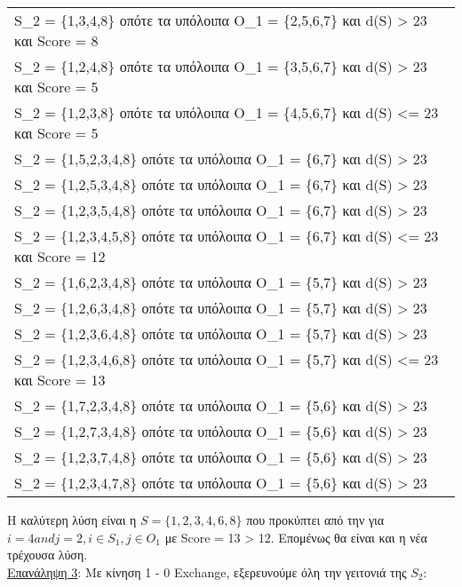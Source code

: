 \documentclass[12pt, a4paper]{article}
\begin{document}
\begin{table}[H]
\centering
\label{my-label}
\begin{tabular}{l}
S\_2 = \{1,3,4,8\} οπότε τα υπόλοιπα Ο\_1 = \{2,5,6,7\} και d(S) > 23 και Score =  8\\
S\_2 = \{1,2,4,8\} οπότε τα υπόλοιπα Ο\_1 = \{3,5,6,7\} και d(S) > 23 και Score =  5\\
S\_2 = \{1,2,3,8\} οπότε τα υπόλοιπα Ο\_1 = \{4,5,6,7\} και d(S) <= 23 και Score =  5\\
S\_2 = \{1,5,2,3,4,8\} οπότε τα υπόλοιπα Ο\_1 = \{6,7\} και d(S) > 23  \\
S\_2 = \{1,2,5,3,4,8\} οπότε τα υπόλοιπα Ο\_1 = \{6,7\} και d(S) > 23  \\
S\_2 = \{1,2,3,5,4,8\} οπότε τα υπόλοιπα Ο\_1 = \{6,7\} και d(S) > 23  \\
S\_2 = \{1,2,3,4,5,8\} οπότε τα υπόλοιπα Ο\_1 = \{6,7\} και d(S) <= 23 και Score =  12\\
S\_2 = \{1,6,2,3,4,8\} οπότε τα υπόλοιπα Ο\_1 = \{5,7\} και d(S) > 23  \\
S\_2 = \{1,2,6,3,4,8\} οπότε τα υπόλοιπα Ο\_1 = \{5,7\} και d(S) > 23  \\
S\_2 = \{1,2,3,6,4,8\} οπότε τα υπόλοιπα Ο\_1 = \{5,7\} και d(S) > 23  \\
S\_2 = \{1,2,3,4,6,8\} οπότε τα υπόλοιπα Ο\_1 = \{5,7\} και d(S) <= 23 και Score =  13\\
S\_2 = \{1,7,2,3,4,8\} οπότε τα υπόλοιπα Ο\_1 = \{5,6\} και d(S) > 23  \\
S\_2 = \{1,2,7,3,4,8\} οπότε τα υπόλοιπα Ο\_1 = \{5,6\} και d(S) > 23  \\
S\_2 = \{1,2,3,7,4,8\} οπότε τα υπόλοιπα Ο\_1 = \{5,6\} και d(S) > 23  \\
S\_2 = \{1,2,3,4,7,8\} οπότε τα υπόλοιπα Ο\_1 = \{5,6\} και d(S) > 23  \\
\end{tabular}
\end{table}

Η καλύτερη λύση είναι η \( S = \{1,2,3,4,6,8\}\)  που προκύπτει από την για \(i = 4 and j = 2, i \in S_1,  j \in O_1\) με Score = 13 > 12.	Επομένως θα είναι και η νέα τρέχουσα λύση. \\


\underline{Επανάληψη 3}: Με κίνηση 1 - 0 Exchange, εξερευνούμε όλη την γειτονιά της \(S_2\):
\end{document}
